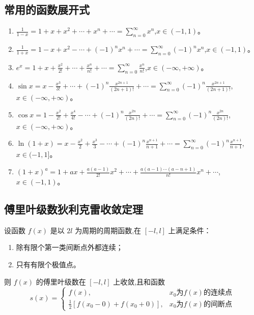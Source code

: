\documentclass[UTF8]{ctexart}
\theoremstyle{remark}
\begin{document}
		\subsection{常用的函数展开式}
		\begin{enumerate}
			\item \(\frac{1}{1 - x}=1 + x + x^2+\cdots + x^n+\cdots=\sum_{n = 0}^{\infty} x^n\),\(x\in(-1,1)\)。
			\item \(\frac{1}{1 + x}=1 - x + x^2-\cdots + (-1)^nx^n+\cdots=\sum_{n = 0}^{\infty} (-1)^nx^n\),\(x\in(-1,1)\)。
			\item \(e^x=1 + x+\frac{x^2}{2!}+\cdots+\frac{x^n}{n!}+\cdots=\sum_{n = 0}^{\infty} \frac{x^n}{n!}\),\(x\in(-\infty,+\infty)\)。
			\item \(\sin x=x-\frac{x^3}{3!}+\cdots+(-1)^n\frac{x^{2n + 1}}{(2n + 1)!}+\cdots=\sum_{n = 0}^{\infty} (-1)^n\frac{x^{2n + 1}}{(2n + 1)!}\),\(x\in(-\infty,+\infty)\)。
			\item \(\cos x=1-\frac{x^2}{2!}+\frac{x^4}{4!}-\cdots+(-1)^n\frac{x^{2n}}{(2n)!}+\cdots=\sum_{n = 0}^{\infty} (-1)^n\frac{x^{2n}}{(2n)!}\),\(x\in(-\infty,+\infty)\)。
			\item \(\ln(1 + x)=x-\frac{x^2}{2}+\frac{x^3}{3}-\cdots+(-1)^n\frac{x^{n + 1}}{n + 1}+\cdots=\sum_{n = 0}^{\infty} (-1)^n\frac{x^{n + 1}}{n + 1}\),\(x\in(-1,1]\)。
			\item \((1 + x)^a=1 + ax+\frac{a(a - 1)}{2!}x^2+\cdots+\frac{a(a - 1)\cdots(a - n + 1)}{n!}x^n+\cdots\),\(x\in(-1,1)\)。
		\end{enumerate}
		
		\subsection{傅里叶级数狄利克雷收敛定理}
		设函数 \(f(x)\) 是以 \(2l\) 为周期的周期函数,在 \([-l, l]\) 上满足条件：
		\begin{enumerate}
			\item 除有限个第一类间断点外都连续；
			\item 只有有限个极值点。
		\end{enumerate}
		则 \(f(x)\) 的傅里叶级数在 \([-l, l]\) 上收敛,且和函数
		\[
		s(x)=
		\begin{cases}
			f(x), & x_0为f(x)的连续点\\
			\frac{1}{2}[f(x_0 - 0)+f(x_0 + 0)], & x_0为f(x)的间断点
		\end{cases}
		\]
		
\end{document}
